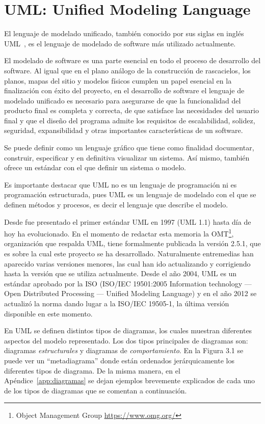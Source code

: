 \documentclass[a4paper, 12pt]{book}
\begin{document}
\section{UML: Unified Modeling Language} 
\label{sec:UML}

El lenguaje de modelado unificado, también conocido por sus siglas en inglés UML~\cite{uml}, es el lenguaje de modelado de software más utilizado actualmente. 

El modelado de software es una parte esencial en todo el proceso de desarrollo del software. Al igual que en el plano análogo de la construcción de rascacielos, los planos, mapas del sitio y modelos físicos cumplen un papel esencial en la finalización con éxito del proyecto, en el desarrollo de software el lenguaje de modelado unificado es necesario para asegurarse de que la funcionalidad del producto final es completa y correcta, de que satisface las necesidades del usuario final y que el diseño del programa admite los requisitos de escalabilidad, solidez, seguridad, expansibilidad y otras importantes características de un software. 

Se puede definir como un lenguaje gráfico que tiene como finalidad documentar, construir, especificar y en definitiva visualizar un sistema. Así mismo, también ofrece un estándar con el que definir un sistema o modelo. 

Es importante destacar que UML no es un lenguaje de programación ni es programación estructurada, pues UML es un lenguaje de modelado con el que se definen métodos y procesos, es decir el lenguaje que describe el modelo.

Desde fue presentado el primer estándar UML en 1997 (UML 1.1) hasta día de hoy ha evolucionado. En el momento de redactar esta memoria la OMT\footnote{Object Management Group \url{https://www.omg.org/}}, organización que respalda UML, tiene formalmente publicada la versión 2.5.1, que es sobre la cual este proyecto se ha desarrollado.
Naturalmente entremedias han aparecido varias versiones menores, las cual han ido actualizando y corrigiendo hasta la versión que se utiliza actualmente. Desde el año 2004, UML es un estándar aprobado por la ISO (ISO/IEC 19501:2005 Information technology — Open Distributed Processing — Unified Modeling Language) y en el año 2012 se actualizó la norma dando lugar a la ISO/IEC 19505-1, la última versión disponible en este momento.

En UML se definen distintos tipos de diagramas, los cuales muestran diferentes aspectos del modelo representado. 
Los dos tipos principales de diagramas son: diagramas \emph{estructurales} y diagramas de \emph{comportamiento}. En la Figura 3.1 se puede ver un ``metadiagrama'' donde están ordenados jerárquicamente los diferentes tipos de diagrama. De la misma manera, en el Apéndice~\ref{app:diagramas} se dejan ejemplos brevemente explicados de cada uno de los tipos de diagramas que se comentan a continuación.
\end{document}
